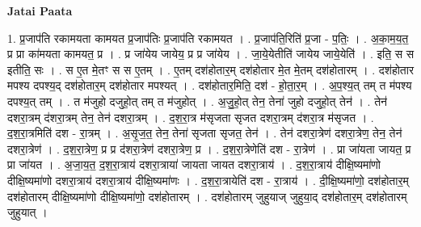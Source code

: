 \documentclass[17pt]{extarticle}
\begin{document}
\textbf{Jatai Paata} \newline

1. प्र॒जाप॑ति रकामयता कामयत प्र॒जाप॑तिः प्र॒जाप॑ति रकामयत । . प्र॒जाप॑ति॒रिति॑ प्र॒जा - प॒तिः॒ । . अ॒का॒म॒य॒त॒ प्र प्रा का॑मयता कामयत॒ प्र । . प्र जा॑येय जायेय॒ प्र प्र जा॑येय । . जा॒ये॒येतीति॑ जायेय जाये॒येति॑ । . इति॒ स स इतीति॒ सः । . स ए॒त मे॒तꣳ स स ए॒तम् । . ए॒तम् दश॑होतार॒म् दश॑होतार मे॒त मे॒तम् दश॑होतारम् । . दश॑होतार मपश्य दपश्य॒द् दश॑होतार॒म् दश॑होतार मपश्यत् । . दश॑होतार॒मिति॒ दश॑ - हो॒ता॒र॒म् । . अ॒प॒श्य॒त् तम् त म॑पश्य दपश्य॒त् तम् । . त म॑जुहो दजुहो॒त् तम् त म॑जुहोत् । . अ॒जु॒हो॒त् तेन॒ तेना॑ जुहो दजुहो॒त् तेन॑ । . तेन॑ दशरा॒त्रम् द॑शरा॒त्रम् तेन॒ तेन॑ दशरा॒त्रम् । . द॒श॒रा॒त्र म॑सृजता सृजत दशरा॒त्रम् द॑शरा॒त्र म॑सृजत । . द॒श॒रा॒त्रमिति॑ दश - रा॒त्रम् । . अ॒सृ॒ज॒त॒ तेन॒ तेना॑ सृजता सृजत॒ तेन॑ । . तेन॑ दशरा॒त्रेण॑ दशरा॒त्रेण॒ तेन॒ तेन॑ दशरा॒त्रेण॑ । . द॒श॒रा॒त्रेण॒ प्र प्र द॑शरा॒त्रेण॑ दशरा॒त्रेण॒ प्र । . द॒श॒रा॒त्रेणेति॑ दश - रा॒त्रेण॑ । . प्रा जा॑यता जायत॒ प्र प्रा जा॑यत । . अ॒जा॒य॒त॒ द॒श॒रा॒त्राय॑ दशरा॒त्राया॑ जायता जायत दशरा॒त्राय॑ । . द॒श॒रा॒त्राय॑ दीक्षि॒ष्यमा॑णो दीक्षि॒ष्यमा॑णो दशरा॒त्राय॑ दशरा॒त्राय॑ दीक्षि॒ष्यमा॑णः । . द॒श॒रा॒त्रायेति॑ दश - रा॒त्राय॑ । . दी॒क्षि॒ष्यमा॑णो॒ दश॑होतार॒म् दश॑होतारम् दीक्षि॒ष्यमा॑णो दीक्षि॒ष्यमा॑णो॒ दश॑होतारम् । . दश॑होतारम् जुहुयाज् जुहुया॒द् दश॑होतार॒म् दश॑होतारम् जुहुयात् । \newline
\end{document}
